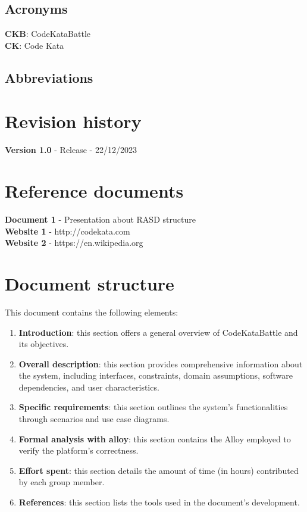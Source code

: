 \documentclass[12pt, a4paper]{report}
\begin{document}
    \subsection{Acronyms}
    \textbf{CKB}: CodeKataBattle 
    \\
    \textbf{CK}: Code Kata
    \subsection{Abbreviations}
    

    \section{Revision history}
    \textbf{Version 1.0} - Release - 22/12/2023


    \section{Reference documents}
    \textbf{Document 1} - Presentation about RASD structure
    \\
    \textbf{Website 1} - http://codekata.com
    \\
    \textbf{Website 2} - https://en.wikipedia.org


    \section{Document structure}
    This document contains the following elements: 
    \begin{enumerate}
        \item \textbf{Introduction}: this section offers a general overview of CodeKataBattle and its objectives.
        \item \textbf{Overall description}: this section provides comprehensive information about the system, including interfaces, constraints, domain assumptions, software dependencies, and user characteristics.
        \item \textbf{Specific requirements}: this section outlines the system's functionalities through scenarios and use case diagrams.
        \item \textbf{Formal analysis with alloy}: this section contains the Alloy employed to verify the platform's correctness.
        \item \textbf{Effort spent}: this section details the amount of time (in hours) contributed by each group member.
        \item \textbf{References}: this section lists the tools used in the document's development.
    \end{enumerate}
\end{document}
